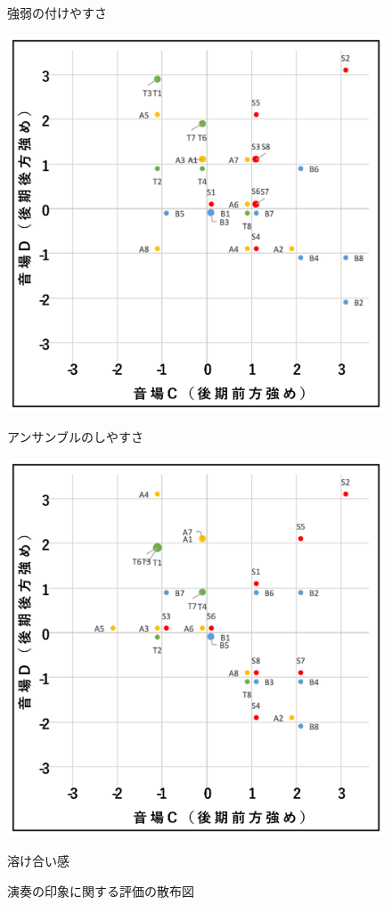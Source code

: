 \documentclass[11pt,a4j]{jreport}
\begin{document}
\begin{figure}[H]
\begin{minipage}{0.5\linewidth}
    \caption*{強弱の付けやすさ}
  \end{minipage}
  \begin{minipage}{.5\linewidth}
    \centering
    \includegraphics[width=.9\linewidth]{images/subjectiveExp/scat_late_10ensemble.png}
    \caption*{アンサンブルのしやすさ}
  \end{minipage}%
  \begin{minipage}{.5\linewidth}
    \centering
    \includegraphics[width=.9\linewidth]{images/subjectiveExp/scat_late_11notConflict.png}
    \caption*{溶け合い感}
  \end{minipage}

  \caption{演奏の印象に関する評価の散布図}
  \label{fig:演奏の印象に関する評価の散布図}
\end{figure}
\end{document}
